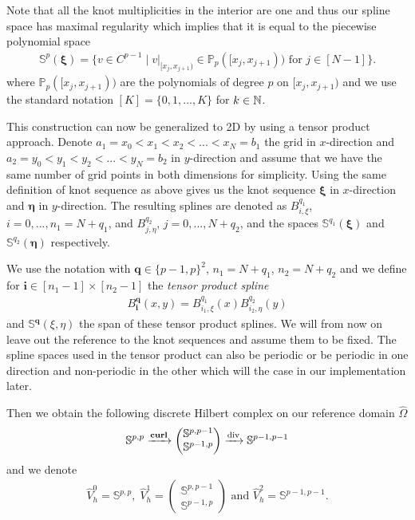 \documentclass[../master_thesis.tex]{subfiles}
\begin{document}
Note that all the knot multiplicities in the interior are one and thus our spline 
space has maximal regularity which implies that it is equal to the piecewise polynomial space
\begin{align*}
    \mathbb{S}^p(\bm{\xi}) = \{ v \in C^{p-1} \mid v |_{[x_j,x_{j+1})} \in \mathbb{P}_p([x_j,x_{j+1})) 
        \text{ for } j\in [N-1]\}.
\end{align*}
where $\mathbb{P}_p([x_j,x_{j+1}))$ are the polynomials of degree $p$ on $[x_j,x_{j+1})$ 
and we use the standard notation $[K] = \{ 0, 1, ..., K\}$ for $k\in \mathbb{N}$.

This construction can now be generalized to 2D by using a tensor product approach.
Denote $a_1 = x_0 < x_1 < x_2 < ... < x_N = b_1$ the grid in $x$-direction and 
$a_2 = y_0 < y_1 < y_2 < ... < y_N = b_2$ in $y$-direction and assume that we have the 
same number of grid points in both dimensions for simplicity. 
Using the same definition of knot sequence as above gives us the knot sequence 
$\bm{\xi}$ in $x$-direction and $\bm{\eta}$ in $y$-direction. The resulting splines 
are denoted as $B_{i,\xi}^{q_1}$, $i=0,...,n_1 = N + q_1$, and $B_{j,\eta}^{q_2}$, 
$j = 0,...,N + q_2$, and the spaces
$\mathbb{S}^{q_1}(\bm{\xi})$ and $\mathbb{S}^{q_2}(\bm{\eta})$ respectively.

We use the notation 
with $\mathbf{q} \in \{p-1,p\}^2$, $n_1 = N + q_1$, $n_2 = N + q_2$ 
and we define for $\mathbf{i} \in [n_1-1] \times [n_2-1]$ the \textit{tensor product spline}
\begin{align*}
    B_\mathbf{i}^\mathbf{q}(x,y) =  B_{i_1,\xi}^{q_1}(x) B_{i_2,\eta}^{q_2}(y)
\end{align*}
and $\mathbb{S}^\mathbf{q}(\xi,\eta)$ 
the span of these tensor product splines. We will from now on leave out the reference 
to the knot sequences and assume them to be fixed.
The spline spaces used in the tensor product can also be periodic or be periodic in 
one direction and non-periodic in the other which will the case in our implementation later. 

Then we obtain the following discrete Hilbert complex on our reference domain $\hat{\Omega}$
\begin{align*}
    \mathbb{S}^{p,p} \xrightarrow{\veccurl} \begin{pmatrix}\mathbb{S}^{p,p-1} \\ \mathbb{S}^{p-1,p}  
    \end{pmatrix} \xrightarrow{\diver} \mathbb{S}^{p-1,p-1}
\end{align*}
and we denote
\begin{align}
     \hat{V}^0_h = \mathbb{S}^{p,p}, \; \hat{V}^1_h = \begin{pmatrix}\mathbb{S}^{p,p-1} \\ \mathbb{S}^{p-1,p}  
    \end{pmatrix}
    \text{ and } \hat{V}^2_h = \mathbb{S}^{p-1,p-1}. \label{eq:discrete_spline_reference_spaces}
\end{align}
\end{document}
